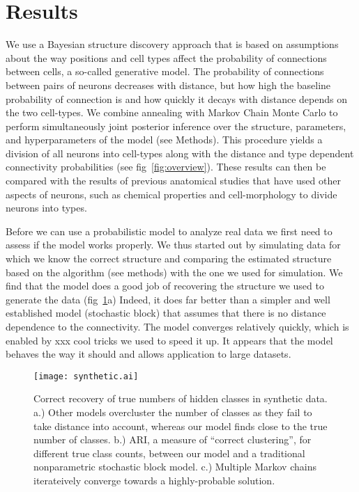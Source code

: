 \documentclass{article}
\begin{document}
\section{Results}
We use a Bayesian structure discovery approach that is based on
assumptions about the way positions and cell types affect the
probability of connections between cells, a so-called generative
model. The probability of connections between pairs of neurons
decreases with distance, but how high the baseline probability of
connection is and how quickly it decays with distance depends on the
two cell-types. We combine annealing with Markov Chain Monte Carlo to
perform simultaneously joint posterior inference over the structure,
parameters, and hyperparameters of the model (see Methods). This
procedure yields a division of all neurons into cell-types along with
the distance and type dependent connectivity probabilities (see
fig~\ref{fig:overview}). These results can then be compared with the
results of previous anatomical studies that have used other aspects of
neurons, such as chemical properties and cell-morphology to divide
neurons into types.

Before we can use a probabilistic model to analyze real data we first
need to assess if the model works properly. We thus started out by
simulating data for which we know the correct structure and comparing
the estimated structure based on the algorithm (see methods) with the
one we used for simulation. We find that the model does a good job of
recovering the structure we used to generate the data (fig~\ref{fig:synthetic}a)
Indeed, it does far better than a simpler and well established
model (stochastic block) that assumes that there is no distance
dependence to the connectivity. The model converges relatively
quickly, which is enabled by xxx cool tricks we used to speed it
up. It appears that the model behaves the way it should and allows
application to large datasets.

\begin{figure}
  \centering 
  \centerline{\texttt{[image: synthetic.ai]}}
  \caption{Correct recovery of true numbers of hidden classes
in synthetic data. a.) Other models overcluster the number
of classes as they fail to take distance into account, whereas
our model finds close to the true number of classes. b.) ARI, a measure
of ``correct clustering'', for
different true class counts, between our model and a traditional
nonparametric stochastic block model. c.) Multiple Markov chains iterateively
converge towards a highly-probable solution. }
\label{fig:synthetic}
\end{figure}
\end{document}

